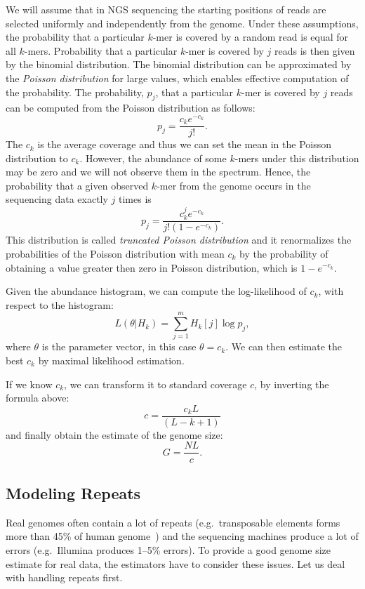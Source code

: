 We will assume that in NGS sequencing the starting positions of reads are selected uniformly and independently from the genome.
Under these assumptions, the probability that a particular $k$-mer is covered by a random read is equal for all $k$-mers. Probability that a particular $k$-mer is covered by $j$ reads is then given by the binomial distribution. The binomial distribution can be approximated by the \emph{Poisson distribution} for large values, which enables effective computation of the probability.
The probability, $p_j$, that a particular $k$-mer is covered by $j$ reads can be computed from the Poisson distribution as follows:
$$ p_j =  \frac{c_k e^{-c_k}}{j!}.$$
The $c_k$ is the average coverage and thus we can set the mean in the Poisson distribution to $c_k$.
However, the abundance of some $k$-mers under this distribution may be zero and we will not observe them in the spectrum. Hence, the probability that a given observed $k$-mer from the genome occurs in the sequencing data exactly $j$ times is $$p_j = \frac{c_k^j e^{-c_k}}{j! (1-e^{-c_k})}.$$
This distribution is called \emph{truncated Poisson distribution} and it renormalizes the probabilities of the Poisson distribution with mean $c_k$ by the probability of obtaining a value greater then zero in Poisson distribution, which is $1-e^{-c_k}$.

Given the abundance histogram, we can compute the log-likelihood of $c_k$, with respect to the histogram:
$$L(\theta | H_k) = \sum_{j=1}^m H_k[j] \log p_j,$$
where $\theta$ is the parameter vector, in this case $\theta = c_k$.
We can then estimate the best $c_k$ by maximal likelihood estimation.

If we know $c_k$, we can transform it to standard coverage $c$, by inverting the formula above:
$$c = \frac{c_k L}{(L - k + 1)}$$
and finally obtain the estimate of the genome size:
$$G = \frac{NL}{c}.$$

\subsection{Modeling Repeats}\label{subsec:repeatmodles}

Real genomes often contain a lot of repeats (e.g.\ transposable elements forms more than 45\% of human genome~\cite{biemont2006genetics}) and the sequencing machines produce a lot of errors (e.g.\ Illumina produces 1--5\% errors). To provide a good genome size estimate for real data, the estimators have to consider these issues. Let us deal with handling repeats first.

